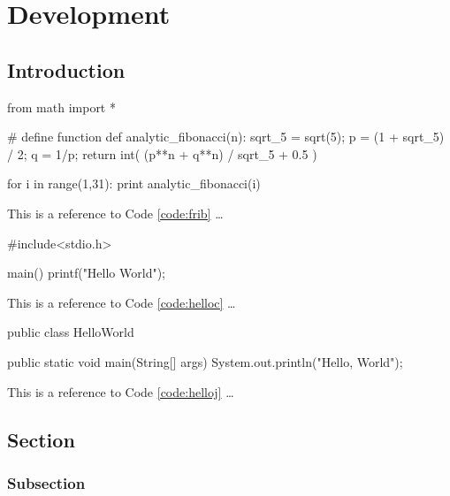 \chapter{Development}

\section{Introduction}

\lipsum[1]

\begin{code}[language=Python,caption=Python Fribonacci Code,label=code:frib]
from math import *

# define function
def analytic_fibonacci(n):
  sqrt_5 = sqrt(5);
  p = (1 + sqrt_5) / 2;
  q = 1/p;
  return int( (p**n + q**n) / sqrt_5 + 0.5 )

for i in range(1,31):
  print analytic_fibonacci(i)
\end{code}


This is a reference to Code \ref{code:frib} \ldots{}

\lipsum[1]

\begin{code}[language=C,caption=Hello World C Code,label=code:helloc]
#include<stdio.h>

main()
    {
        printf("Hello World");
    }
\end{code}


This is a reference to Code \ref{code:helloc} \ldots{}

\lipsum[1]

\begin{code}[language=Java,caption=Hello Java Code,label=code:helloj]
public class HelloWorld {

    public static void main(String[] args) {
        System.out.println("Hello, World");
    }
}
\end{code}


This is a reference to Code \ref{code:helloj} \ldots{}


\section{Section}

\lipsum[2-4]

\subsection{Subsection}

\lipsum[2-4]
